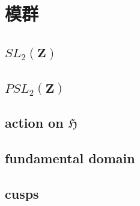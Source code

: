 \section{模群}
\label{b3:sec:2301}


\subsection{\texorpdfstring{\(SL_2(\mathbf Z)\)}{SL2()}}
\label{b3:subsec:230101}

\subsection{\texorpdfstring{\(PSL_2(\mathbf Z)\)}{PSL2()}}
\label{b3:subsec:230102}

\subsection{action on \texorpdfstring{\(\mathfrak H\)}{m}}
\label{b3:subsec:230103}

\subsection{fundamental domain}
\label{b3:subsec:230104}

\subsection{cusps}
\label{b3:subsec:230105}


